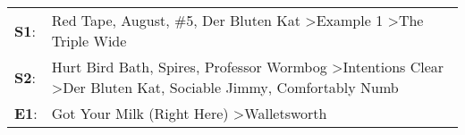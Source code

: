 \begin{supertabular}{p{0.03\textwidth}p{0.92\textwidth}}
 \textbf{S1}:  &                                                                         Red Tape\textsuperscript{}, \enspace August\textsuperscript{}, \enspace \#5\textsuperscript{}, \enspace Der Bluten Kat\textsuperscript{} \textgreater \enspace Example 1\textsuperscript{} \textgreater \enspace The Triple Wide\textsuperscript{}  \enspace  \\
 \textbf{S2}:  &  Hurt Bird Bath\textsuperscript{}, \enspace Spires\textsuperscript{}, \enspace Professor Wormbog\textsuperscript{} \textgreater \enspace Intentions Clear\textsuperscript{} \textgreater \enspace Der Bluten Kat\textsuperscript{}, \enspace Sociable Jimmy\textsuperscript{}, \enspace Comfortably Numb\textsuperscript{}  \enspace  \\
 \textbf{E1}:  &                                                                                                                                                                                                                          Got Your Milk (Right Here)\textsuperscript{} \textgreater \enspace Walletsworth\textsuperscript{}  \enspace  \\
\end{supertabular}
